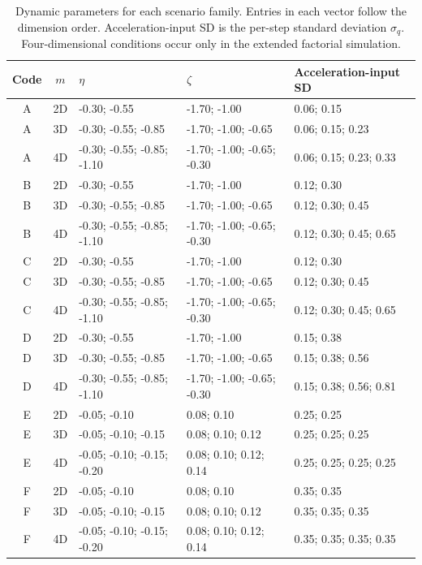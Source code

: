 \documentclass[
]{article}
\begin{document}
\begingroup\scriptsize\setlength{\tabcolsep}{4pt}
\begin{table}[H]

\caption{Dynamic parameters for each scenario family. Entries in each vector follow the dimension order. Acceleration-input SD is the per-step standard deviation $\sigma_q$. Four-dimensional conditions occur only in the extended factorial simulation.}
\centering
\footnotesize
{}

\begin{tabular}[t]{ccp{1.70in}p{1.70in}p{1.65in}}
\toprule
Code & $m$ & $\eta$ & $\zeta$ & Acceleration-input SD\\
\midrule
A & 2D & -0.30; -0.55 & -1.70; -1.00 & 0.06; 0.15\\
A & 3D & -0.30; -0.55; -0.85 & -1.70; -1.00; -0.65 & 0.06; 0.15; 0.23\\
A & 4D & -0.30; -0.55; -0.85; -1.10 & -1.70; -1.00; -0.65; -0.30 & 0.06; 0.15; 0.23; 0.33\\
B & 2D & -0.30; -0.55 & -1.70; -1.00 & 0.12; 0.30\\
B & 3D & -0.30; -0.55; -0.85 & -1.70; -1.00; -0.65 & 0.12; 0.30; 0.45\\
\addlinespace
B & 4D & -0.30; -0.55; -0.85; -1.10 & -1.70; -1.00; -0.65; -0.30 & 0.12; 0.30; 0.45; 0.65\\
C & 2D & -0.30; -0.55 & -1.70; -1.00 & 0.12; 0.30\\
C & 3D & -0.30; -0.55; -0.85 & -1.70; -1.00; -0.65 & 0.12; 0.30; 0.45\\
C & 4D & -0.30; -0.55; -0.85; -1.10 & -1.70; -1.00; -0.65; -0.30 & 0.12; 0.30; 0.45; 0.65\\
D & 2D & -0.30; -0.55 & -1.70; -1.00 & 0.15; 0.38\\
\addlinespace
D & 3D & -0.30; -0.55; -0.85 & -1.70; -1.00; -0.65 & 0.15; 0.38; 0.56\\
D & 4D & -0.30; -0.55; -0.85; -1.10 & -1.70; -1.00; -0.65; -0.30 & 0.15; 0.38; 0.56; 0.81\\
E & 2D & -0.05; -0.10 & 0.08; 0.10 & 0.25; 0.25\\
E & 3D & -0.05; -0.10; -0.15 & 0.08; 0.10; 0.12 & 0.25; 0.25; 0.25\\
E & 4D & -0.05; -0.10; -0.15; -0.20 & 0.08; 0.10; 0.12; 0.14 & 0.25; 0.25; 0.25; 0.25\\
\addlinespace
F & 2D & -0.05; -0.10 & 0.08; 0.10 & 0.35; 0.35\\
F & 3D & -0.05; -0.10; -0.15 & 0.08; 0.10; 0.12 & 0.35; 0.35; 0.35\\
F & 4D & -0.05; -0.10; -0.15; -0.20 & 0.08; 0.10; 0.12; 0.14 & 0.35; 0.35; 0.35; 0.35\\
\bottomrule
\end{tabular}
\end{table}\endgroup
\end{document}
